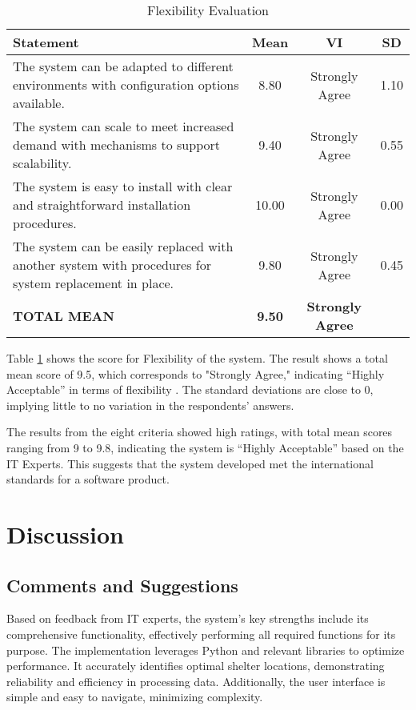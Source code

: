 \documentclass[12pt,a4paper,]{article}
\begin{document}
	\begin{table}[h!]
		\centering
		\caption{Flexibility Evaluation}
		\label{flxblty}
		\renewcommand{\arraystretch}{1.2}
		\begin{tabularx}{\linewidth}{|X|c|c|c|}
			\hline
			\textbf{Statement} & \textbf{Mean} & \textbf{VI} & \textbf{SD} \\ \hline
			The system can be adapted to different environments with configuration options available.
			& 8.80 & Strongly Agree & 1.10 \\ \hline
			The system can scale to meet increased demand with mechanisms to support scalability.
			& 9.40 & Strongly Agree & 0.55 \\ \hline
			The system is easy to install with clear and straightforward installation procedures.
			& 10.00 & Strongly Agree & 0.00 \\ \hline
			The system can be easily replaced with another system with procedures for system replacement in place.
			& 9.80 & Strongly Agree & 0.45 \\ \hline
			\textbf{TOTAL MEAN} & \textbf{9.50} & \textbf{Strongly Agree} & \\ \hline
		\end{tabularx}
	\end{table}
	
	Table \ref{flxblty} shows the score for Flexibility of the system. The result shows a total mean score of 9.5, which corresponds to "Strongly Agree," indicating “Highly Acceptable” in terms of flexibility . The standard deviations are close to 0, implying little to no variation in the respondents’ answers.
	
	The results from the eight criteria showed high ratings, with total mean scores ranging from 9 to 9.8, indicating the system is “Highly Acceptable” based on the IT Experts. This suggests that the system developed met the international standards for a software product.
	

\section{Discussion}
	\subsection{Comments and Suggestions}
	Based on feedback from IT experts, the system's key strengths include its comprehensive functionality, effectively performing all required functions for its purpose. The implementation leverages Python and relevant libraries to optimize performance. It accurately identifies optimal shelter locations, demonstrating reliability and efficiency in processing data. Additionally, the user interface is simple and easy to navigate, minimizing complexity.
	
\end{document}
